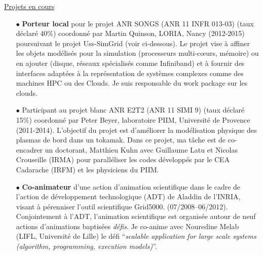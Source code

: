 \documentclass[11pt]{article}
\begin{document}
\underline{Projets en cours}\\
\begin{itemize}


\item[$\bullet$]
\textbf{Porteur local} pour le projet ANR SONGS (ANR 11 INFR 013-03)  (taux déclaré 40\%)
coordonné par Martin Quinson, LORIA, Nancy (2012-2015)  poursuivant le projet 
Uss-SimGrid (voir ci-dessous). Le projet vise à affiner les objets modélisés pour la 
simulation (processeurs multi-c{\oe}urs, mémoire) ou en ajouter (disque, réseaux spécialisés
comme Infiniband) et à fournir des interfaces adaptées à la représentation de systèmes
complexes comme des machines HPC ou des Clouds. Je suis responsable du work package
sur les clouds.\\

\item[$\bullet$]
Participant au projet blanc ANR E2T2 (ANR 11 SIMI 9) (taux déclaré 15\%) coordonné par 
Peter Beyer, laboratoire PIIM, Université de Provence (2011-2014). L'objectif du projet 
est d'améliorer la modélisation physique des plasmas de bord dans un tokamak. Dans ce
projet, ma tâche est de co-encadrer un doctorant, Matthieu Kuhn avec Guillaume Latu et
Nicolas Crouseille (IRMA) pour paralléliser les codes développés par le CEA Cadarache 
(IRFM) et les physiciens du PIIM. \\

\item[$\bullet$]
\textbf{Co-animateur} d'une action d'animation scientifique 
dans le cadre de l'action de développement technologique (ADT) de Aladdin de l'INRIA, 
visant à pérenniser l'outil scientifique Grid5000. (07/2008--06/2012). 
Conjointement à l'ADT, l'animation scientifique est organisée autour de neuf actions d'animations baptisées \emph{défis}.
Je co-anime avec Nouredine Melab (LIFL, Université de Lille) le défi 
``{\em scalable application for large scale systems (algorithm, programming, execution models)}''.\\
\end{itemize}
\end{document}
